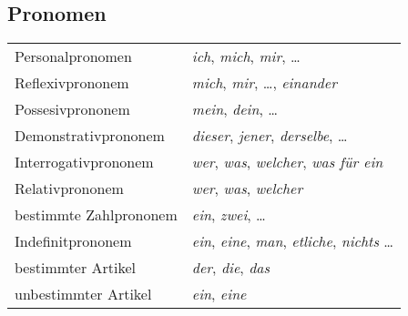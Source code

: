 \subsection{Pronomen}
\settowidth{\MyLenA}{bestimmte Zahlprononem~~}
\begin{tabular}{@{}p{\the\MyLenA}%
				@{}p{\linewidth-\the\MyLenA}}
	Personalpronomen & \textit{ich}, \textit{mich}, \textit{mir}, \dots\\
	Reflexivprononem & \textit{mich}, \textit{mir}, \dots, \textit{einander}\\
	Possesivprononem & \textit{mein}, \textit{dein}, \dots\\
	Demonstrativprononem & \textit{dieser}, \textit{jener}, \textit{derselbe}, \dots\\
	Interrogativprononem & \textit{wer}, \textit{was}, \textit{welcher}, \textit{was für ein}\\
	Relativprononem & \textit{wer}, \textit{was}, \textit{welcher}\\
	bestimmte Zahlprononem & \textit{ein}, \textit{zwei}, \dots\\
	Indefinitprononem & \textit{ein}, \textit{eine}, \textit{man}, \textit{etliche}, \textit{nichts} \dots\\
	bestimmter Artikel & \textit{der}, \textit{die}, \textit{das}\\
	unbestimmter Artikel & \textit{ein}, \textit{eine}\\
\end{tabular}